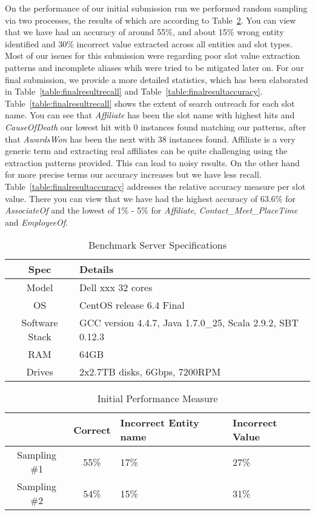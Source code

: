 On the performance of our initial submission run we performed random sampling via two processes, the results of which are according to Table~\ref{table:initialresult}. You can view that we have had an accuracy of around 55\%, and about 15\% wrong entity identified and 30\% incorrect value extracted across all entities and slot types. Most of our issues for this submission were regarding poor slot value extraction patterns and incomplete aliases whih were tried to be mtigated later on. For our final submission, we provide a more detailed statistics, which has been elaborated in Table~\ref{table:finalresultrecall} and Table~\ref{table:finalresultaccuracy}. Table~\ref{table:finalresultrecall} shows the extent of search outreach for
each slot name. You can see that \textit{Affiliate} has been the slot name with highest hits and \textit{CauseOfDeath} our lowest hit with 0 instances found matching our patterns, after that \textit{AwardsWon} has been the next with 38 instances found. Affiliate is a very generic term and extracting real affiliates can be quite challenging using the extraction patterns provided. This can lead to noisy results. On the other hand for more precise terms our accuracy increases but we have less recall. Table~\ref{table:finalresultaccuracy} addresses the relative accuracy measure per slot value. There you can view that we have had the highest accuracy of 63.6\% for \textit{AssociateOf} and the lowest of 1\% - 5\%  for \textit{Affiliate}, \textit{Contact\_Meet\_PlaceTime} and \textit{EmployeeOf}.

\begin{table}
\caption{Benchmark Server Specifications }
\centering
\label{table:serverspec}
\begin{tabular}{| c | p{4.8cm} |}
\hline 
\textbf{Spec} & \textbf{Details} \\ \hline
Model & Dell xxx 32 cores \\ \hline 
OS & CentOS release 6.4 Final \\ \hline 
Software Stack & GCC version 4.4.7, Java 1.7.0\_25, Scala 2.9.2, SBT 0.12.3 \\ \hline 
 RAM & 64GB\\ \hline 
 Drives & 2x2.7TB disks, 6Gbps, 7200RPM\\ \hline 
\end{tabular} 
\end{table}







\begin{table}
\caption{Initial Performance Measure }
\centering
\label{table:initialresult}

\begin{tabular}{ | c | c | p{2cm} | p{13mm} |}
\hline 
 & \textbf{Correct} & \textbf{Incorrect Entity name} & \textbf{Incorrect Value} \\ 
\hline 
Sampling \#1 & 55\% & 17\% & 27\% \\ 
\hline Sampling \#2 & 54\% & 15\% & 31\%  \\ 
\hline 
\end{tabular} 
\end{table}


